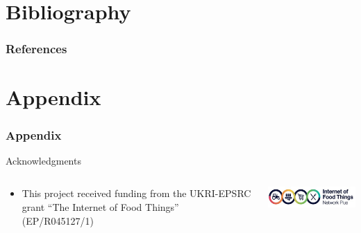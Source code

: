 \documentclass[aspectratio=169]{beamer}
\begin{document}
  \section{Bibliography}

    \begin{frame}[allowframebreaks]
      \frametitle{References}
      
    \end{frame}

  \section{Appendix}

    \begin{frame}[allowframebreaks]
      \frametitle{Appendix}
    \end{frame}

    \begin{frame}{Acknowledgments}
      \begin{columns}
        \begin{column}{0.5\textwidth}
          \begin{itemize}
            \item This project received funding from the UKRI-EPSRC grant “The Internet of Food Things” (EP/R045127/1)
          \end{itemize}
        \end{column}
        \begin{column}{0.5\textwidth}
          \includegraphics[width=0.5\linewidth]{ioft.png}
        \end{column}
      \end{columns}
    \end{frame}
\end{document}
